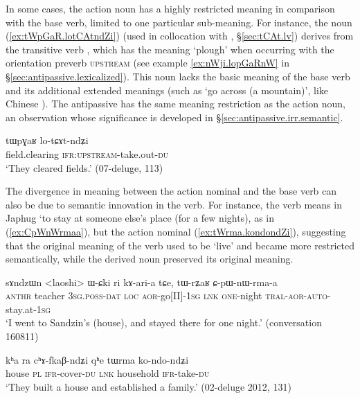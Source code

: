 In some cases, the action noun has a highly restricted meaning in comparison with the base verb, limited to one particular sub-meaning. For instance, the noun  (\ref{ex:tWpGaR.lotCAtndZi}) (used in collocation with , §\ref{sec:tCAt.lv}) derives from the transitive verb , which has the meaning `plough' when occurring with the orientation preverb \textsc{upstream} (see example \ref{ex:nWji.lopGaRnW} in §\ref{sec:antipassive.lexicalized}). This noun lacks the basic meaning of the base verb and its additional extended meanings (such as `go across (a mountain)', like Chinese ). The antipassive  has the same meaning restriction as the action noun, an observation whose significance is developed in §\ref{sec:antipassive.irr.semantic}.

\begin{exe}
\ex \label{ex:tWpGaR.lotCAtndZi}
\gll tɯpɣaʁ lo-tɕɤt-ndʑi \\
field.clearing \textsc{ifr}:\textsc{upstream}-take.out-\textsc{du} \\
\glt `They cleared fields.' (07-deluge, 113)
\end{exe} 

The divergence in meaning between the action nominal and the base verb can also be due to semantic innovation in the verb. For instance, the verb  means in Japhug `to stay at someone else's place (for a few nights), as in (\ref{ex:CpWnWrmaa}), but the action nominal  (\ref{ex:tWrma.kondondZi}), suggesting that the original meaning of the verb used to be `live' and became more restricted semantically, while the derived noun preserved its original meaning.

\begin{exe}
\ex \label{ex:CpWnWrmaa}
\gll sɤndzɯn <laoshi> ɯ-ɕki ri kɤ-ari-a tɕe, tɯ-rʑaʁ ɕ-pɯ-nɯ-rma-a \\
\textsc{anthr} teacher \textsc{3sg}.\textsc{poss}-\textsc{dat} \textsc{loc} \textsc{aor}-go[II]-\textsc{1sg} \textsc{lnk} \textsc{one}-night \textsc{tral}-\textsc{aor}-\textsc{auto}-stay.at-\textsc{1sg} \\
\glt `I went to Sandzin's (house), and stayed there for one night.' (conversation 160811)
\end{exe}

\begin{exe}
\ex \label{ex:tWrma.kondondZi}
\gll kʰa ra cʰɤ-fkaβ-ndʑi qʰe tɯrma ko-ndo-ndʑi \\
house \textsc{pl} \textsc{ifr}-cover-\textsc{du} \textsc{lnk} household \textsc{ifr}-take-\textsc{du} \\
\glt `They built a house and established a family.' (02-deluge 2012, 131)
\end{exe}

